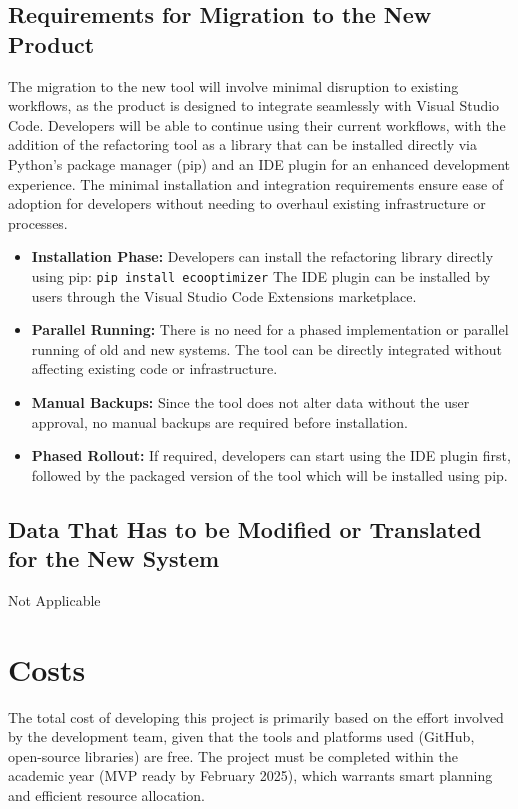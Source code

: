 \documentclass[12pt]{article}
\begin{document}
\subsection{Requirements for Migration to the New Product}
The migration to the new tool will involve minimal disruption to
existing workflows, as the product is designed to integrate
seamlessly with Visual Studio Code. Developers will be able to
continue using their current workflows, with the addition of the
refactoring tool as a library that can be installed directly via
Python's package manager (pip) and an IDE plugin for an enhanced
development experience. The minimal installation and integration
requirements ensure ease of adoption for developers without needing
to overhaul existing infrastructure or processes.
\begin{itemize}
  \item \textbf{Installation Phase:}
    Developers can install the refactoring library directly using pip:
    \verb|pip install ecooptimizer|
    The IDE plugin can be installed by users through the Visual
    Studio Code Extensions marketplace.
  \item \textbf{Parallel Running:}
    There is no need for a phased implementation or parallel running
    of old and new systems. The tool can be directly integrated
    without affecting existing code or infrastructure.
  \item \textbf{Manual Backups:}
    Since the tool does not alter data without the user approval, no
    manual backups are required
    before installation.
  \item \textbf{Phased Rollout:}
    If required, developers can start using the IDE plugin first,
    followed by the packaged version
    of the tool which will be installed using pip.
\end{itemize}
\subsection{Data That Has to be Modified or Translated for the New System}
Not Applicable

\section{Costs}
The total cost of developing this project is primarily based on the
effort involved by the development team, given that the tools and
platforms used (GitHub, open-source libraries) are free. The project
must be completed within the academic year (MVP ready by February
2025), which warrants smart planning and efficient resource allocation.
\end{document}
